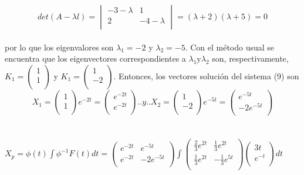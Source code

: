 \documentclass[11.5pt]{article}
\begin{document}
$$ det(A-\lambda l)=\begin{vmatrix}
-3-\lambda&1\\
2&-4-\lambda\\
\end{vmatrix}
=(\lambda+2)(\lambda+5)=0$$\\
por lo que los eigenvalores son $\lambda_1=-2$ y $\lambda_2 =-5$. Con el método usual se encuentra que los eigenvectores correspondientes a $\lambda_1 $y$ \lambda_2 $ son, respectivamente,$K_1=\begin{pmatrix}
1\\
1\\
\end{pmatrix}
$ y $
K_1=\begin{pmatrix}
1\\
-2\\
\end{pmatrix}$. Entonces, los vectores solución del sistema (9) son\\
$$X_1=\begin{pmatrix}
1\\
1\\
\end{pmatrix}e^{-2t}=
\begin{pmatrix}
e^{-2t}\\
e^{-2t}\\
\end{pmatrix}
 ..y .. X_2=\begin{pmatrix}
1\\
-2\\
\end{pmatrix}e^{-5t}=
\begin{pmatrix}
e^{-5t}\\
-2e^{-5t}\\
\end{pmatrix}$$\\
\vspace{0.3cm}\\
$X_p=\phi(t)\int\phi^{-1}F(t)dt=\begin{pmatrix}
e^{-2t}&e^{-5t}\\
e^{-2t}&-2e^{-5t}\\
\end{pmatrix}
\int
\begin{pmatrix}
\frac{2}{3}e^{2t}&\frac{1}{3}e^{2t}\\
\frac{1}{3}e^{2t}&-\frac{1}{3}e^{5t}\\
\end{pmatrix}
\begin{pmatrix}
3t\\
e^{-t}\\
\end{pmatrix}dt$\\
\end{document}
